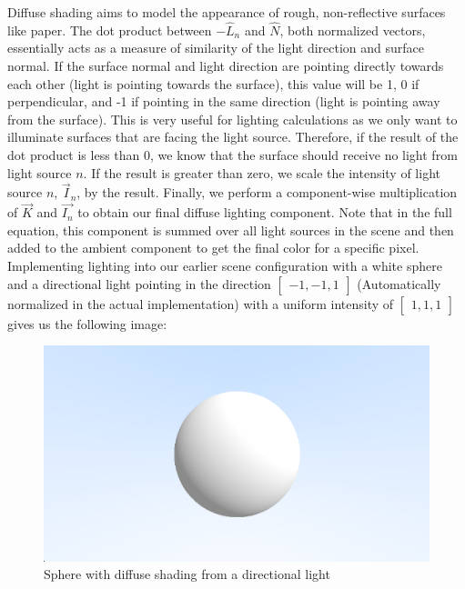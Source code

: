 Diffuse shading aims to model the appearance of rough, non-reflective surfaces like paper. The dot product between $-\hat{L}_{n}$ and $\hat{N}$, both normalized vectors, essentially acts as a measure of similarity of the light direction and surface normal. If the surface normal and light direction are pointing directly towards each other (light is pointing towards the surface), this value will be 1, 0 if perpendicular, and -1 if pointing in the same direction (light is pointing away from the surface). This is very useful for lighting calculations as we only want to illuminate surfaces that are facing the light source. Therefore, if the result of the dot product is less than 0, we know that the surface should receive no light from light source $n$. If the result is greater than zero, we scale the intensity of light source $n$, $\Vec{I}_n$, by the result. Finally, we perform a component-wise multiplication of $\Vec{K}$ and $\Vec{I_n}$ to obtain our final diffuse lighting component. Note that in the full equation, this component is summed over all light sources in the scene and then added to the ambient component to get the final color for a specific pixel. Implementing lighting into our earlier scene configuration with a white sphere and a directional light pointing in the direction $\begin{bmatrix}-1, -1, 1\end{bmatrix}$ (Automatically normalized in the actual implementation) with a uniform intensity of $\begin{bmatrix}1, 1, 1\end{bmatrix}$ gives us the following image:
\begin{figure}[H]
    \centering
    \includegraphics[scale=0.4]{figures/DiffuseSphere.png}
    \caption{Sphere with diffuse shading from a directional light}
    \label{fig:diffuse_sphere}
\end{figure}
